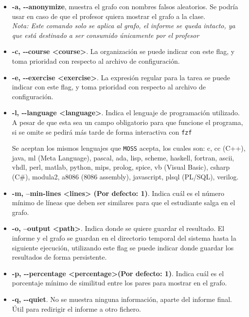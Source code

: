 \begin{itemize}
    \item \textbf{-a, -{}-anonymize}, muestra el grafo con nombres falsos aleatorios. Se podría usar en caso de que el profesor quiera mostrar el grafo a la clase.\\
    \emph{Nota: Este comando solo se aplica al grafo, el informe se queda intacto, ya que está destinado a ser consumido únicamente por el profesor}
    \item \textbf{-c, -{}-course <course>}. La organización se puede indicar con este flag, y toma prioridad con respecto al archivo de configuración.
    \item \textbf{-e, -{}-exercise <exercise>}. La expresión regular para la tarea se puede indicar con este flag, y toma prioridad con respecto al archivo de configuración.
    \item \textbf{-l, -{}-language <language>}. Indica el lenguaje de programación utilizado.\\
    A pesar de que esta sea un campo obligatorio para que funcione el programa, si se omite se pedirá más tarde de forma interactiva con \verb|fzf|
    
    Se aceptan los mismos lenguajes que \verb|MOSS| acepta, los cuales son: c, cc (C++), java, ml (Meta Language), pascal, ada, lisp, scheme, haskell, fortran, ascii, vhdl, perl, matlab, python, mips, prolog, spice, vb (Visual Basic), csharp (C\#), modula2, a8086 (8086 assembly), javascript, plsql (PL/SQL), verilog.
    \item \textbf{-m, --min-lines <lines> (Por defecto: 1)}. Indica cuál es el número mínimo de líneas que deben ser similares para que el estudiante salga en el grafo.
    \item \textbf{-o, --output <path>}. Indica donde se quiere guardar el resultado. El informe y el grafo se guardan en el directorio temporal del sistema hasta la siguiente ejecución, utilizando este flag se puede indicar donde guardar los resultados de forma persistente.
    \item \textbf{-p, -{}-percentage <percentage>(Por defecto: 1)}. Indica cuál es el porcentaje mínimo de similitud entre los pares para mostrar en el grafo.
    \item \textbf{-q, -{}-quiet}. No se muestra ninguna información, aparte del informe final. Útil para redirigir el informe a otro fichero.
\end{itemize}
